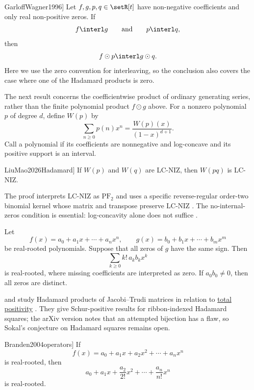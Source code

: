 \begin{theorem}[Garloff--Wagner, see \cite[Thm.~4]{GarloffWagner1996}]
Let $f,g,p,q \in \setR[t]$ have non-negative coefficients and only
real non-positive zeros.  If
\[
  f \interl g
  \qquad\text{and}\qquad
  p \interl q,
\]
then
\[
  f\odot p \interl g\odot q.
\]
Here we use the zero convention for interleaving, so the conclusion also
covers the case where one of the Hadamard products is zero.
\end{theorem}

The next result concerns the coefficientwise product of ordinary generating
series, rather than the finite polynomial product $f\odot g$ above.  For a
nonzero polynomial $p$ of degree $d$, define $W(p)$ by
\[
 \sum_{n\geq0}p(n)x^n=\frac{W(p)(x)}{(1-x)^{d+1}}.
\]
Call a polynomial \label{lcNizPolynomial} if its coefficients
are nonnegative and log-concave and its positive support is an interval.

\begin{theorem}[Liu--Mao, \cite[Thm.~1.2]{LiuMao2026Hadamard}]
If $W(p)$ and $W(q)$ are LC-NIZ, then $W(pq)$ is LC-NIZ.
\end{theorem}

The proof interprets LC-NIZ as \hyperref[pfTwoLogConcavity]{$\mathrm{PF}_2$}
and uses a specific reverse-regular order-two binomial kernel whose matrix and
transpose preserve LC-NIZ
\cite[Prop.~2.4 and Cor.~3.6]{LiuMao2026Hadamard}.
The no-internal-zeros condition is essential: log-concavity alone does not
suffice \cite[Rem.~4.2]{LiuMao2026Hadamard}.

\begin{theorem}
Let
\[
  f(x)=a_0+a_1x+\dotsb+a_nx^n,
  \qquad
  g(x)=b_0+b_1x+\dotsb+b_mx^m
\]
be real-rooted polynomials.  Suppose that all zeros of $g$ have the
same sign.  Then
\[
  \sum_{k\geq 0} k!\,a_kb_kx^k
\]
is real-rooted, where missing coefficients are interpreted as zero.
If $a_0b_0\neq 0$, then all zeros are distinct.
\end{theorem}

 and  study Hadamard products of
Jacobi--Trudi matrices in relation to
\hyperref[totallyNonnegative]{total positivity} \cite{KimOh2025x}.
They give Schur-positive results for ribbon-indexed Hadamard squares; the
arXiv version notes that an attempted bijection has a flaw, so Sokal's
conjecture on Hadamard squares remains open.

\begin{theorem}[Laguerre, see \cite[Thm.~12]{Branden2004operators}]
If
\[
  f(x)=a_0+a_1x+a_2x^2+\dotsb+a_nx^n
\]
is real-rooted, then
\[
  a_0+a_1x+\frac{a_2}{2!}x^2+\dotsb+\frac{a_n}{n!}x^n
\]
is real-rooted.
\end{theorem}

